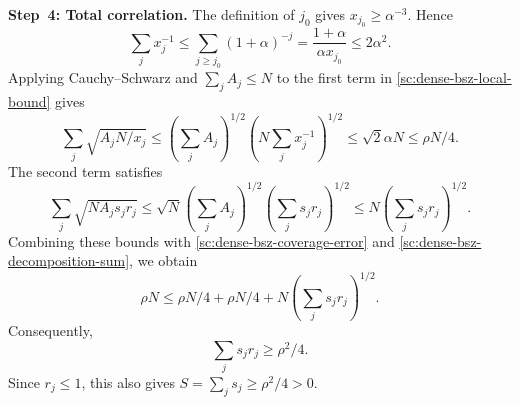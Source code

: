 \documentclass[twoside]{aomart}
\makeatletter
\theoremstyle{paperplain}
\theoremstyle{paperdefinition}
\renewenvironment{proof}[1][\proofname]{\par\pushQED{\qed}%
  \normalfont\topsep6\p@\@plus3\p@\relax\trivlist
  \item[\hskip\labelsep\itshape #1\@addpunct{.}]\ignorespaces
}{\popQED\endtrivlist\@endpefalse}
\numberwithin{equation}{section}
\makeatother
\begin{document}
\begin{proof}
\par
\medskip
\noindent\textbf{Step~4: Total correlation.}
The definition of $j_0$ gives $x_{j_0}\ge\alpha^{-3}$. Hence
\begin{equation*}
 \sum_jx_j^{-1}
 \le\sum_{j\ge j_0}(1+\alpha)^{-j}
 =\frac{1+\alpha}{\alpha x_{j_0}}
 \le2\alpha^2.
 \end{equation*}
Applying Cauchy--Schwarz and $\sum_jA_j\le N$ to the first
term in \eqref{sc:dense-bsz-local-bound} gives
\begin{equation*}
 \sum_j\sqrt{A_jN/x_j}
 \le\left(\sum_jA_j\right)^{1/2}
      \left(N\sum_jx_j^{-1}\right)^{1/2}
 \le\sqrt2\alpha N\le\rho N/4.
\end{equation*}
The second term satisfies
\begin{equation*}
 \sum_j\sqrt{NA_js_jr_j}
 \le\sqrt N\left(\sum_jA_j\right)^{1/2}
              \left(\sum_js_jr_j\right)^{1/2}
 \le N\left(\sum_js_jr_j\right)^{1/2}.
 \end{equation*}
Combining these bounds with
\eqref{sc:dense-bsz-coverage-error} and
\eqref{sc:dense-bsz-decomposition-sum}, we obtain
\begin{equation*}
 \rho N\le\rho N/4+\rho N/4
             +N\left(\sum_js_jr_j\right)^{1/2}.
 \end{equation*}
Consequently,
\begin{equation}
 \sum_js_jr_j\ge\rho^2/4.
 \label{sc:dense-bsz-energy}
\end{equation}
Since $r_j\le1$, this also gives $\displaystyle S=\sum_js_j\ge\rho^2/4>0$.


\end{proof}
\end{document}
